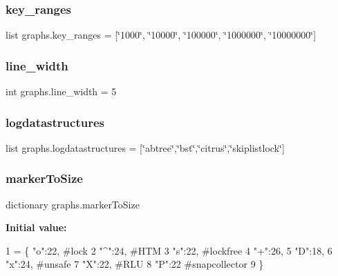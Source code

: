 \subsubsection{\texorpdfstring{key\+\_\+ranges}{key\_ranges}}
{\footnotesize\ttfamily list graphs.\+key\+\_\+ranges = \mbox{[}\char`\"{}1000\char`\"{}, \char`\"{}10000\char`\"{}, \char`\"{}100000\char`\"{}, \char`\"{}1000000\char`\"{}, \char`\"{}10000000\char`\"{}\mbox{]}}

\mbox{\label{namespacegraphs_a325c6af7df764147d257f3b56c53c9a9}} 
\subsubsection{\texorpdfstring{line\+\_\+width}{line\_width}}
{\footnotesize\ttfamily int graphs.\+line\+\_\+width = 5}

\mbox{\label{namespacegraphs_a3d840fdf3d8f4d0b19182f9d6c532dec}} 
\subsubsection{\texorpdfstring{logdatastructures}{logdatastructures}}
{\footnotesize\ttfamily list graphs.\+logdatastructures = \mbox{[}\char`\"{}abtree\char`\"{},\char`\"{}bst\char`\"{},\char`\"{}citrus\char`\"{},\char`\"{}skiplistlock\char`\"{}\mbox{]}}

\mbox{\label{namespacegraphs_a311d9eae4590cc31845a23875aafa4f0}} 
\subsubsection{\texorpdfstring{marker\+To\+Size}{markerToSize}}
{\footnotesize\ttfamily dictionary graphs.\+marker\+To\+Size}

{\bfseries Initial value\+:}
\begin{DoxyCode}
1 =  \{    \textcolor{stringliteral}{"o"}:22, \textcolor{comment}{#lock}
2                     \textcolor{stringliteral}{"^"}:24, \textcolor{comment}{#HTM}
3                     \textcolor{stringliteral}{"s"}:22, \textcolor{comment}{#lockfree}
4                     \textcolor{stringliteral}{"+"}:26, 
5                     \textcolor{stringliteral}{"D"}:18, 
6                     \textcolor{stringliteral}{"x"}:24, \textcolor{comment}{#unsafe}
7                     \textcolor{stringliteral}{"X"}:22, \textcolor{comment}{#RLU}
8                     \textcolor{stringliteral}{"P"}:22  \textcolor{comment}{#snapcollector}
9                 \}
\end{DoxyCode}
\mbox{\label{namespacegraphs_a7f1d0aeed3f9ddfe995e0910fff50431}} 

